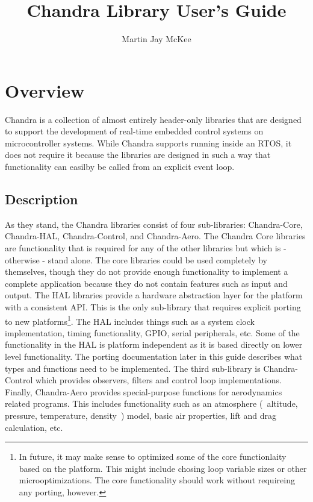 \documentclass[12pt,letterpaper,article]{memoir} %
\title{Chandra Library User's Guide}
\author{Martin Jay McKee}
\begin{document}

\maketitle
\tableofcontents* %

\chapter{Overview}
Chandra is a collection of almost entirely header-only libraries that are designed to support the development of real-time embedded control systems on microcontroller systems.  While Chandra supports running inside an RTOS, it does not require it because the libraries are designed in such a way that functionality can easilby be called from an explicit event loop.

\section{Description}
As they stand, the Chandra libraries consist of four sub-libraries: Chandra-Core, Chandra-HAL, Chandra-Control, and Chandra-Aero.  The Chandra Core libraries are functionality that is required for any of the other libraries but which is - otherwise - stand alone.  The core libraries could be used completely by themselves, though they do not provide enough functionality to implement a complete application because they do not contain features such as input and output.  The HAL libraries provide a hardware abstraction layer for the platform with a consistent API.  This is the only sub-library that requires explicit porting to new platforms\footnote{In future, it may make sense to optimized some of the core functionlaity based on the platform.  This might include chosing loop variable sizes or other microoptimizations.  The core functionality should work without requireing any porting, however.}.  The HAL includes things such as a system clock implementation, timing functionality, GPIO, serial peripherals, etc.  Some of the functionality in the HAL is platform independent as it is based directly on lower level functionality.  The porting documentation later in this guide describes what types and functions need to be implemented.  The third sub-library is Chandra-Control which provides observers, filters and control loop implementations.  Finally, Chandra-Aero provides special-purpose functions for aerodynamics related programs.  This includes functionality such as an atmosphere (~altitude, pressure, temperature, density~) model, basic air properties, lift and drag calculation, etc.
\end{document}
